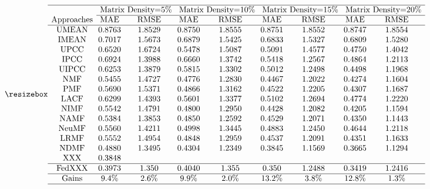 
\[
    \resizebox {
    \setlength{\arraycolsep}{1pt}
    \begin{array}{ccccccccc}
    \hline & \multicolumn{2}{c}{\text { Matrix Density=5\% }} & \multicolumn{2}{c}{\text { Matrix Density=10\% }} & \multicolumn{2}{c}{\text { Matrix Density=15\% }} & \multicolumn{2}{c}{\text { Matrix Density=20\% }} \\
    \cline { 2 - 9 } \text { Approaches } & \text { MAE } & \text { RMSE } & \text { MAE } & \text { RMSE } & \text { MAE } & \text { RMSE } & \text { MAE } & \text { RMSE } \\
    \hline \text { UMEAN } & 0.8763 & 1.8529 & 0.8750 & 1.8555 & 0.8751 & 1.8552 & 0.8747 & 1.8554 \\
    \text { IMEAN } & 0.7017 & 1.5673 & 0.6879 & 1.5425 & 0.6833 & 1.5327 & 0.6809 & 1.5280 \\
    \text { UPCC } & 0.6520 & 1.6724 & 0.5478 & 1.5087 & 0.5091 & 1.4577 & 0.4750 & 1.4042 \\
    \text { IPCC } & 0.6924 & 1.3988 & 0.6660 & 1.3742 & 0.5418 & 1.2567 & 0.4864 & 1.2113 \\
    \text { UIPCC } & 0.6253 & 1.3879 & 0.5815 & 1.3302 & 0.5012 & 1.2498 & 0.4498 & 1.1968 \\
    \text { NMF } & 0.5455 & 1.4727 & 0.4776 & 1.2830 & 0.4467 & 1.2022 & 0.4274 & 1.1604 \\
    \text { PMF } & 0.5690 & 1.5371 & 0.4866 & 1.3162 & 0.4522 & 1.2205 & 0.4307 & 1.1687 \\
    \text { LACF } & 0.6299 & 1.4393 & 0.5601 & 1.3377 & 0.5102 & 1.2694 & 0.4774 & 1.2220 \\
    \text { NIMF } & 0.5542 & 1.4791 & 0.4800 & 1.2950 & 0.4428 & 1.2082 & 0.4205 & 1.1594 \\
    \text { NAMF } & 0.5384 & 1.3853 & 0.4850 & 1.2592 & 0.4529 & 1.2071 & 0.4350 & 1.1443 \\
    \text { NeuMF } & 0.5560 & 1.4211 & 0.4998 & 1.3445 & 0.4883 & 1.2450 & 0.4644 & 1.2118 \\
    \text { LRMF } & 0.5552 & 1.4954 & 0.4848 & 1.2959 & 0.4537 & 1.2091 & 0.4351 & 1.1633 \\
    \text { NDMF } & 0.4880 & 1.3495 & 0.4304 & 1.2349 & 0.3845 & 1.1569 & 0.3665 & 1.1294 \\
    \text {XXX} & 0.3848 \\
    \hline \text { FedXXX } &0.3973 &1.350 &0.4040 &1.355 &0.350 &1.2488 &0.3419 &1.2416\\
    \hline \text { Gains } & 9.4 \% & 2.6 \% & 9.9 \% & 2.0 \% & 13.2 \% & 3.8 \% & 12.8 \% & 1.3 \% \\
    \hline
    \end{array}
    
    }
    \]